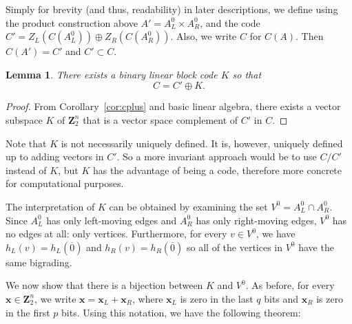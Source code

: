 \documentclass[12pt,twoside,singlespace]{article}
\numberwithin{equation}{section}
\newtheorem{lem}[equation]{Lemma}
\theoremstyle{definition}
\newcommand{\ZZ}{\mathbf{Z}}
\renewcommand{\vec}[1]{\mathbf{#1}}
\begin{document}
Simply for brevity (and thus, readability) in later descriptions, we define using the product construction above $A'=A_L^0\times A_R^0$, and the code $C'=Z_L(C(A_L^0))\oplus Z_R(C(A_R^0))$.  Also, we write $C$ for $C(A)$.  Then $C(A')=C'$ and $C'\subset C$.

\begin{lem}
\label{lem:existk}
There exists a binary linear block code $K$ so that
\[C=C' \oplus K.
\]
\end{lem}
\begin{proof}
From Corollary~\ref{cor:cplus} and basic linear algebra, there exists a vector subspace $K$ of $\ZZ_2^n$ that is a vector space complement of
$C'$ in $C$.
\end{proof}
Note that $K$ is not necessarily uniquely defined.  It is, however, uniquely defined up to adding vectors in $C'$.  So a more invariant approach would be to use $C/C'$ instead of $K$, but $K$ has the advantage of being a code, therefore more concrete for computational purposes.



The interpretation of $K$ can be obtained by examining the set $V^0=A_L^0\cap A_R^0$.  Since $A_L^0$ has only left-moving edges and $A_R^0$ has only right-moving edges, $V^0$ has no edges at all: only vertices.  Furthermore, for every $v\in V^0$, we have $h_L(v)=h_L(\overline{0})$ and $h_R(v)=h_R(\overline{0})$ so all of the vertices in $V^0$ have the same bigrading.

We now show that there is a bijection between $K$ and $V^0$. As before, for every $\vec{x}\in\ZZ_2^n$, we write $\vec{x}=\vec{x}_L+\vec{x}_R$, where $\vec{x}_L$ is zero in the last $q$ bits and $\vec{x}_R$ is zero in the first $p$ bits.  Using this notation, we have the following theorem:
\end{document}

